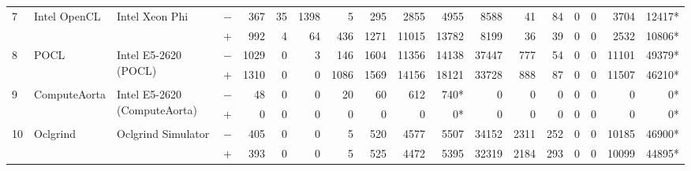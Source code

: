 \begin{tabular}{llll | rrrrrrr | rrrrrrr }
\hline
\multirow{ 2}{*}{7} & \multirow{ 2}{*}{Intel OpenCL} & \multirow{ 2}{*}{Intel Xeon Phi} & $-$ & 367 & 35 & 1398 & 5 & 295 & 2855 & 4955       & 8588 & 41 & 84 & 0 & 0 & 3704 & 12417* \\& & & $+$ & 992 & 4 & 64 & 436 & 1271 & 11015 & 13782 & 8199 & 36 & 39 & 0 & 0 & 2532 & 10806* \\
\hline
\multirow{ 2}{*}{8} & \multirow{ 2}{*}{POCL} & \multirow{ 2}{*}{Intel E5-2620 (POCL)} & $-$ & 1029 & 0 & 3 & 146 & 1604 & 11356 & 14138       & 37447 & 777 & 54 & 0 & 0 & 11101 & 49379* \\& & & $+$ & 1310 & 0 & 0 & 1086 & 1569 & 14156 & 18121 & 33728 & 888 & 87 & 0 & 0 & 11507 & 46210* \\
\hline
\multirow{ 2}{*}{9} & \multirow{ 2}{*}{ComputeAorta} & \multirow{ 2}{*}{Intel E5-2620 (ComputeAorta)} & $-$ & 48 & 0 & 0 & 20 & 60 & 612 & 740*       & 0 & 0 & 0 & 0 & 0 & 0 & 0* \\& & & $+$ & 0 & 0 & 0 & 0 & 0 & 0 & 0* & 0 & 0 & 0 & 0 & 0 & 0 & 0* \\
\hline
\multirow{ 2}{*}{10} & \multirow{ 2}{*}{Oclgrind} & \multirow{ 2}{*}{Oclgrind Simulator} & $-$ & 405 & 0 & 0 & 5 & 520 & 4577 & 5507       & 34152 & 2311 & 252 & 0 & 0 & 10185 & 46900* \\& & & $+$ & 393 & 0 & 0 & 5 & 525 & 4472 & 5395 & 32319 & 2184 & 293 & 0 & 0 & 10099 & 44895* \\
  \bottomrule
\end{tabular}


